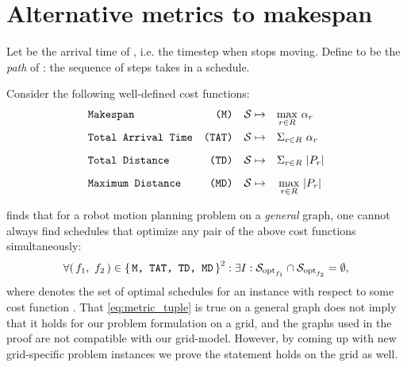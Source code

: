 \section{Alternative metrics to makespan}\label{chapter:alternative_metrics}

Let  be the arrival time of , i.e. the timestep when  stops moving. 
Define  to be the \emph{path} of : the sequence of steps  takes in a schedule. 

Consider the following well-defined cost functions:
\begin{align*}
	& \texttt{Makespan} 				& \texttt{(M)} && \mathcal{S} \mapsto \quad & \smash{\max_{r \in R}} \ \alpha_r 	\\[2mm] 
	& \texttt{Total Arrival Time} 	& \texttt{(TAT)} && \mathcal{S} \mapsto \quad & \Sigma_{r \in R} \ \alpha_r 		\\[2mm]
	& \texttt{Total Distance} 		& \texttt{(TD)} && \mathcal{S} \mapsto \quad & \Sigma_{r \in R} \ \lvert P_r\rvert 		\\[2mm]
	& \texttt{Maximum Distance} 		& \texttt{(MD)} && \mathcal{S} \mapsto \quad & \max_{r \in R} \ \lvert P_r\rvert
\end{align*}


\cite{corr/YuL15c} finds that for a robot motion planning problem on a \emph{general} graph, one cannot always find schedules that optimize any pair of the above cost functions simultaneously: 
\begin{align}\label{eq:metric_tuple}
	\forall (\, f_1,\ f_2 \,) \in \set{\texttt{M, TAT, TD, MD}}^2 : \exists I : \mathcal{S}_{\text{opt}_{f_1}} \cap \mathcal{S}_{\text{opt}_{f_2}} = \emptyset,
\end{align}
where  denotes the set of optimal schedules for an instance  with respect to some cost function . 
That \cref{eq:metric_tuple} is true on a general graph does not imply that it holds for our problem formulation on a grid, and the graphs used in the proof are not compatible with our grid-model. 
However, by coming up with new grid-specific problem instances we prove the statement holds on the grid as well.

